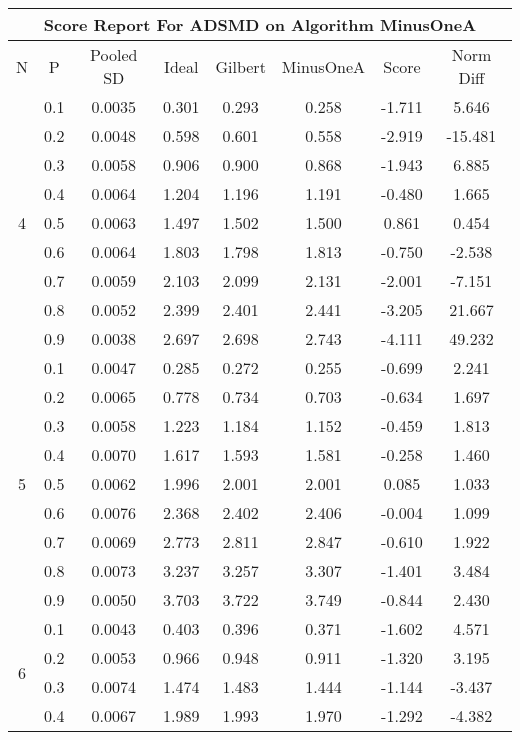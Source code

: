 \documentclass[11pt,a4paper]{report}
\begin{document}
\begin{longtable}{ | c | c || c | c | c | c | c | c | }
\hline
\multicolumn{8}{|c|}{ Score Report For ADSMD on Algorithm MinusOneA} \\
\hline
N & P & Pooled SD &  Ideal &  Gilbert & MinusOneA  & Score & Norm Diff \\
 \hline
 \hline
 \endhead
\multirow{9}{*}{4} & 0.1 & 0.0035 & 0.301 & 0.293 & 0.258 & -1.711 & 5.646 \\
 & 0.2 & 0.0048 & 0.598 & 0.601 & 0.558 & -2.919 & -15.481 \\
 & 0.3 & 0.0058 & 0.906 & 0.900 & 0.868 & -1.943 & 6.885 \\
 & 0.4 & 0.0064 & 1.204 & 1.196 & 1.191 & -0.480 & 1.665 \\
 & 0.5 & 0.0063 & 1.497 & 1.502 & 1.500 & 0.861 & 0.454 \\
 & 0.6 & 0.0064 & 1.803 & 1.798 & 1.813 & -0.750 & -2.538 \\
 & 0.7 & 0.0059 & 2.103 & 2.099 & 2.131 & -2.001 & -7.151 \\
 & 0.8 & 0.0052 & 2.399 & 2.401 & 2.441 & -3.205 & 21.667 \\
 & 0.9 & 0.0038 & 2.697 & 2.698 & 2.743 & -4.111 & 49.232 \\
 \hline
\multirow{9}{*}{5} & 0.1 & 0.0047 & 0.285 & 0.272 & 0.255 & -0.699 & 2.241 \\
 & 0.2 & 0.0065 & 0.778 & 0.734 & 0.703 & -0.634 & 1.697 \\
 & 0.3 & 0.0058 & 1.223 & 1.184 & 1.152 & -0.459 & 1.813 \\
 & 0.4 & 0.0070 & 1.617 & 1.593 & 1.581 & -0.258 & 1.460 \\
 & 0.5 & 0.0062 & 1.996 & 2.001 & 2.001 & 0.085 & 1.033 \\
 & 0.6 & 0.0076 & 2.368 & 2.402 & 2.406 & -0.004 & 1.099 \\
 & 0.7 & 0.0069 & 2.773 & 2.811 & 2.847 & -0.610 & 1.922 \\
 & 0.8 & 0.0073 & 3.237 & 3.257 & 3.307 & -1.401 & 3.484 \\
 & 0.9 & 0.0050 & 3.703 & 3.722 & 3.749 & -0.844 & 2.430 \\
 \hline
\multirow{9}{*}{6} & 0.1 & 0.0043 & 0.403 & 0.396 & 0.371 & -1.602 & 4.571 \\
 & 0.2 & 0.0053 & 0.966 & 0.948 & 0.911 & -1.320 & 3.195 \\
 & 0.3 & 0.0074 & 1.474 & 1.483 & 1.444 & -1.144 & -3.437 \\
 & 0.4 & 0.0067 & 1.989 & 1.993 & 1.970 & -1.292 & -4.382 \\

\end{longtable}
\end{document}
